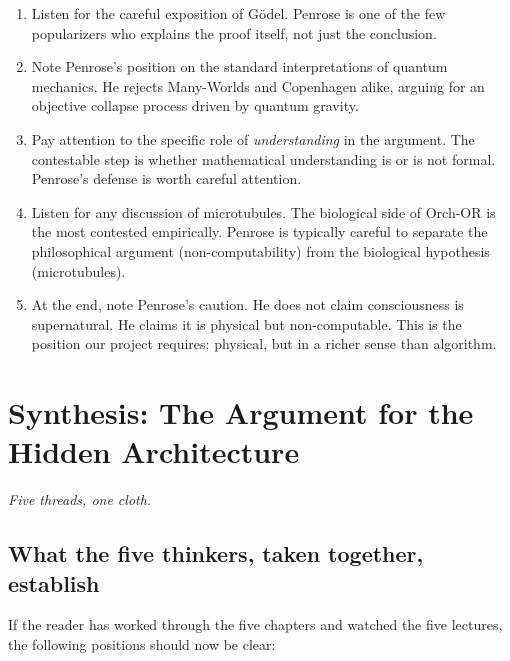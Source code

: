 \documentclass[11pt,a4paper]{book}
\theoremstyle{cleanrm}
\begin{document}
\begin{watchbox}
\begin{enumerate}[leftmargin=2em]
    \item Listen for the careful exposition of G\"odel. Penrose is one
    of the few popularizers who explains the proof itself, not just
    the conclusion.
    \item Note Penrose's position on the standard interpretations of
    quantum mechanics. He rejects Many-Worlds and Copenhagen alike,
    arguing for an objective collapse process driven by quantum gravity.
    \item Pay attention to the specific role of \emph{understanding}
    in the argument. The contestable step is whether mathematical
    understanding is or is not formal. Penrose's defense is worth
    careful attention.
    \item Listen for any discussion of microtubules. The biological
    side of Orch-OR is the most contested empirically. Penrose is
    typically careful to separate the philosophical argument
    (non-computability) from the biological hypothesis
    (microtubules).
    \item At the end, note Penrose's caution. He does not claim
    consciousness is supernatural. He claims it is physical but
    non-computable. This is the position our project requires:
    physical, but in a richer sense than algorithm.
\end{enumerate}
\end{watchbox}

\chapter{Synthesis: The Argument for the Hidden Architecture}

\epigraph{\itshape Five threads, one cloth.}{}

\section{What the five thinkers, taken together, establish}

If the reader has worked through the five chapters and watched the
five lectures, the following positions should now be clear:
\end{document}
